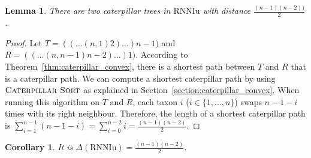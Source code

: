 \documentclass{amsart}
\newcommand{\rnniu}{\mathrm{RNNIu}}
\newcommand{\csort}{\textsc{Caterpillar Sort}}
\newtheorem{lemma}[definition]{Lemma}
\newtheorem{corollary}[definition]{Corollary}
\begin{document}
\begin{lemma}
	There are two caterpillar trees in $\rnniu$ with distance $\frac{(n-1)(n-2))}{2}$.
	\label{lemma:caterpillar_diameter}
\end{lemma}

\begin{proof}
	Let $T = (( \dots (n,1)2)\dots)n-1)$ and $R = (( \dots (n,n-1)n-2)\dots)1)$.
    According to Theorem~\ref{thm:caterpillar_convex}, there is a shortest path between $T$ and $R$ that is a caterpillar path.
    We can compute a shortest caterpillar path by using $\csort$ as explained in Section~\ref{section:caterpillar_convex}.
    When running this algorithm on $T$ and $R$, each taxon $i$ ($i \in \{1, \ldots, n\}$) swaps $n-1-i$ times with its right neighbour.
    Therefore, the length of a shortest caterpillar path is $\sum\limits_{i=1}^{n-1}(n-1-i) = \sum\limits_{i=0}^{n-2}i = \frac{(n-1)(n-2)}{2}$.
\end{proof}

\begin{corollary}
    It is $\Delta(\rnniu) = \frac{(n-1)(n-2)}{2}$.
\end{corollary}

\end{document}
